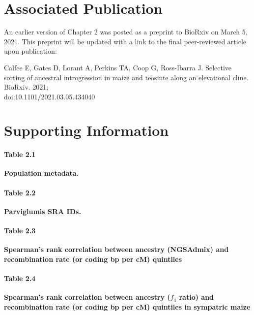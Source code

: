 \medskip

\section*{Associated Publication}
An earlier version of Chapter 2 was posted as a preprint to BioRxiv on March 5, 2021. This preprint will be updated with a link to the final peer-reviewed article upon publication: \newline

Calfee E, Gates D, Lorant A, Perkins TA, Coop G, Ross-Ibarra J. Selective sorting of ancestral introgression in maize and teosinte along an elevational cline. BioRxiv. 2021;\\
doi:10.1101/2021.03.05.434040

%


%

\newpage
\section*{Supporting Information}


\paragraph*{Table 2.1}
\label{population_metadata}
{\bf Population metadata.} 

\newpage

\paragraph*{Table 2.2}
\label{parv50}
{\bf Parviglumis SRA IDs.} 


\newpage

\paragraph*{Table 2.3}
\label{spearmans_rho_ngsadmix}
{\bf Spearman's rank correlation between \mexicana ancestry (NGSAdmix) and recombination rate (or coding bp per cM) quintiles}


\paragraph*{Table 2.4}
\label{spearmans_rho_f4_sympatric_maize_pop22}
{\bf Spearman's rank correlation between ancestry ($f_4$ ratio) and recombination rate (or coding bp per cM) quintiles in sympatric maize}



